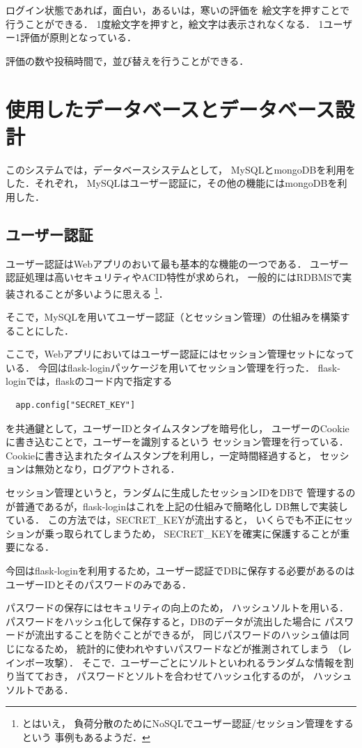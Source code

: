 \documentclass[a4paper,11pt]{jsreport}
\begin{document}
ログイン状態であれば，面白い，あるいは，寒いの評価を
絵文字を押すことで行うことができる．
1度絵文字を押すと，絵文字は表示されなくなる．
1ユーザー1評価が原則となっている．

評価の数や投稿時間で，並び替えを行うことができる．

\section{使用したデータベースとデータベース設計}
このシステムでは，データベースシステムとして，
MySQLとmongoDBを利用をした．それぞれ，
MySQLはユーザー認証に，その他の機能にはmongoDBを利用した．
\subsection{ユーザー認証}
ユーザー認証はWebアプリのおいて最も基本的な機能の一つである．
ユーザー認証処理は高いセキュリティやACID特性が求められ，
一般的にはRDBMSで実装されることが多いように思える
\footnote{とはいえ，
負荷分散のためにNoSQLでユーザー認証/セッション管理をするという
事例もあるようだ．}．

そこで，MySQLを用いてユーザー認証（とセッション管理）の仕組みを構築することにした．

ここで，Webアプリにおいてはユーザー認証にはセッション管理セットになっている．
今回はflask-loginパッケージ\cite{flask-login}を用いてセッション管理を行った．
flask-loginでは，flaskのコード内で指定する
\begin{lstlisting}
  app.config["SECRET_KEY"]
\end{lstlisting}
を共通鍵として，ユーザーIDとタイムスタンプを暗号化し，
ユーザーのCookieに書き込むことで，ユーザーを識別するという
セッション管理を行っている．Cookieに書き込まれたタイムスタンプを利用し，一定時間経過すると，
セッションは無効となり，ログアウトされる．

セッション管理というと，ランダムに生成したセッションIDをDBで
管理するのが普通であるが，flask-loginはこれを上記の仕組みで簡略化し
DB無しで実装している．
この方法では，SECRET\_KEYが流出すると，
いくらでも不正にセッションが乗っ取られてしまうため，
SECRET\_KEYを確実に保護することが重要になる．

今回はflask-loginを利用するため，ユーザー認証でDBに保存する必要があるのは
ユーザーIDとそのパスワードのみである．

パスワードの保存にはセキュリティの向上のため，
ハッシュソルトを用いる．
パスワードをハッシュ化して保存すると，DBのデータが流出した場合に
パスワードが流出することを防ぐことができるが，
同じパスワードのハッシュ値は同じになるため，
統計的に使われやすいパスワードなどが推測されてしまう
（レインボー攻撃）．
そこで．ユーザーごとにソルトといわれるランダムな情報を割り当てておき，
パスワードとソルトを合わせてハッシュ化するのが，
ハッシュソルトである．
\end{document}
